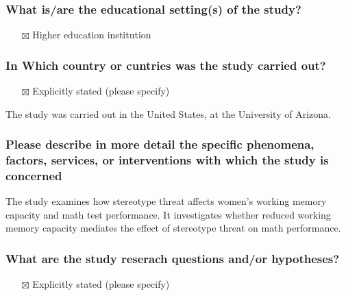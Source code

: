 \documentclass[
  doc, a4paper]{apa7}
\providecommand{\tightlist}{%
  \setlength{\itemsep}{0pt}\setlength{\parskip}{0pt}}
\begin{document}
\subsubsection{What is/are the educational setting(s) of the study?}\label{what-isare-the-educational-settings-of-the-study}

\begin{itemize}
\tightlist
\item[$\boxtimes$]
  Higher education institution
\end{itemize}

\subsubsection{In Which country or cuntries was the study carried out?}\label{in-which-country-or-cuntries-was-the-study-carried-out}

\begin{itemize}
\tightlist
\item[$\boxtimes$]
  Explicitly stated (please specify)
\end{itemize}

The study was carried out in the United States, at the University of Arizona.

\subsubsection{Please describe in more detail the specific phenomena, factors, services, or interventions with which the study is concerned}\label{please-describe-in-more-detail-the-specific-phenomena-factors-services-or-interventions-with-which-the-study-is-concerned}

The study examines how stereotype threat affects women's working memory capacity and math test performance. It investigates whether reduced working memory capacity mediates the effect of stereotype threat on math performance.

\subsubsection{What are the study reserach questions and/or hypotheses?}\label{what-are-the-study-reserach-questions-andor-hypotheses}

\begin{itemize}
\tightlist
\item[$\boxtimes$]
  Explicitly stated (please specify)
\end{itemize}
\end{document}
